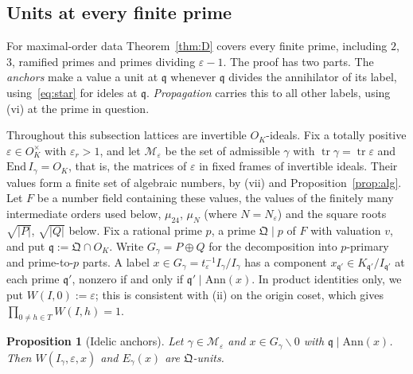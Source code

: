\documentclass[11pt]{amsart}
\numberwithin{equation}{section}
\theoremstyle{plain}
\newtheorem{proposition}[theorem]{Proposition}
\theoremstyle{definition}
\theoremstyle{remark}
\begin{document}
\subsection{Units at every finite prime}\label{sec:units}

For maximal-order data Theorem~\ref{thm:D} covers every finite prime, including \(2\), \(3\), ramified primes and primes dividing \(\varepsilon-1\). The proof has two parts. The \emph{anchors} make a value a unit at \(\mathfrak q\) whenever \(\mathfrak q\) divides the annihilator of its label, using~\eqref{eq:star} for ideles at \(\mathfrak q\). \emph{Propagation} carries this to all other labels, using (vi) at the prime in question.

Throughout this subsection lattices are invertible \(O_K\)-ideals. Fix a totally positive \(\varepsilon\in O_K^\times\) with \(\varepsilon_r>1\), and let \(\mathcal M_\varepsilon\) be the set of admissible \(\gamma\) with \(\operatorname{tr}\gamma=\operatorname{tr}\varepsilon\) and \(\mathrm{End}\,I_\gamma=O_K\), that is, the matrices of \(\varepsilon\) in fixed frames of invertible ideals. Their values form a finite set of algebraic numbers, by (vii) and Proposition~\ref{prop:alg}. Let \(F\) be a number field containing these values, the values of the finitely many intermediate orders used below, \(\mu_{24}\), \(\mu_{N}\) (where \(N=N_\varepsilon\)) and the square roots \(\sqrt{|P|}\), \(\sqrt{|Q|}\) below. Fix a rational prime \(p\), a prime \(\mathfrak Q\mid p\) of \(F\) with valuation \(v\), and put \(\mathfrak q:=\mathfrak Q\cap O_K\). Write \(G_\gamma=P\oplus Q\) for the decomposition into \(p\)-primary and prime-to-\(p\) parts. A label \(x\in G_\gamma=t_\varepsilon^{-1}I_\gamma/I_\gamma\) has a component \(x_{\mathfrak q'}\in K_{\mathfrak q'}/I_{\mathfrak q'}\) at each prime \(\mathfrak q'\), nonzero if and only if \(\mathfrak q'\mid\mathrm{Ann}(x)\). In product identities only, we put \(W(I,0):=\varepsilon\); this is consistent with (ii) on the origin coset, which gives \(\prod_{0\ne h\in T}W(I,h)=1\).

\begin{proposition}[Idelic anchors]\label{prop:anchors}
Let \(\gamma\in\mathcal M_\varepsilon\) and \(x\in G_\gamma\smallsetminus0\) with \(\mathfrak q\mid\mathrm{Ann}(x)\). Then \(W(I_\gamma,\varepsilon,x)\) and \(E_\gamma(x)\) are \(\mathfrak Q\)-units.
\end{proposition}
\end{document}
